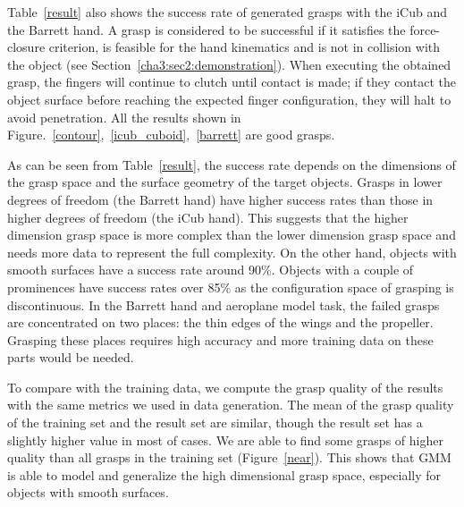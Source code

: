 Table~\ref{result} also shows the success rate of generated grasps with the iCub and the Barrett hand. A grasp is considered to be successful if it satisfies the force-closure criterion, is feasible for the hand kinematics and is not in collision with the object (see Section~\ref{cha3:sec2:demonstration}). When executing the obtained grasp, the fingers will continue to clutch until contact is made; if they contact the object surface before reaching the expected finger configuration, they will halt to avoid penetration.
All the results shown in Figure.~\ref{contour},~\ref{icub_cuboid},~\ref{barrett} are good grasps.

As can be seen from Table~\ref{result}, the success rate depends on the dimensions of the grasp space and the surface geometry of the target objects. Grasps in lower degrees of freedom (the Barrett hand) have higher success rates than those in higher degrees of freedom (the iCub hand). This suggests that the higher dimension grasp space is more complex than the lower dimension grasp space and needs more data to represent the full complexity. On the other hand, objects with smooth surfaces have a success rate around 90\%. Objects with a couple of prominences have success rates over 85\% as the configuration space of grasping is discontinuous. In the Barrett hand and aeroplane model task, the failed grasps are concentrated on two places: the thin edges of the wings and the propeller. Grasping these places requires high accuracy and more training data on these parts would be needed.

To compare with the training data, we compute the grasp quality of the results with the same metrics we used in data generation. The mean of the grasp quality of the training set and the result set are similar, though the result set has a slightly higher value in most of cases. We are able to find some grasps of higher quality than all grasps in the training set (Figure~\ref{near}). This shows that GMM is able to model and generalize the high dimensional grasp space, especially for objects with smooth surfaces.




